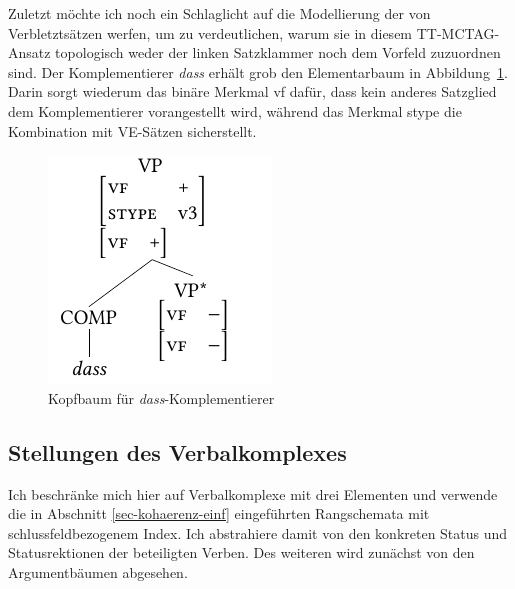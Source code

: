 Zuletzt möchte ich noch ein Schlaglicht auf die Modellierung der  von Verbletztsätzen werfen, um zu verdeutlichen, warum sie in diesem TT-MCTAG-Ansatz topologisch weder der linken Satzklammer noch dem Vorfeld zuzuordnen sind. Der Komplementierer {\it dass} erhält grob den Elementarbaum in Abbildung~\ref{fig-ttmctag-comp}. Darin sorgt wiederum das binäre Merkmal {\sc vf} dafür, dass kein anderes Satzglied dem Komplementierer vorangestellt wird, während das  Merkmal {\sc stype} die Kombination mit VE-Sätzen sicherstellt.

\begin{figure}[t]
\centering
\includegraphics{graphics/abb79.pdf}
\caption{\label{fig-ttmctag-comp}Kopfbaum für \emph{dass}-Komplementierer}
\end{figure} 
  

\subsection{Stellungen des Verbalkomplexes}

Ich beschränke mich hier auf Verbalkomplexe mit drei Elementen und verwende die in Abschnitt \ref{sec-kohaerenz-einf} eingeführten Rangschemata mit schlussfeldbezogenem Index. Ich abstrahiere damit von den konkreten Status und Statusrektionen der beteiligten Verben. Des weiteren wird zunächst von den Argumentbäumen abgesehen.


